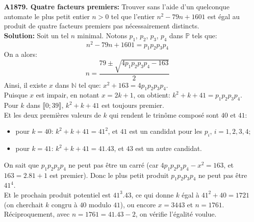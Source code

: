 \documentclass[11pt] {article}
\newcommand{\N} {\mathbb{N}}
\newcommand{\PS} {\mathbb{P}}
\begin{document}



\textbf{A1879. Quatre facteurs premiers:} Trouver sans l'aide d'un quelconque automate le plus petit entier $n > 0$ tel que l'entier $n^{2} - 79n + 1601$ est égal au produit de quatre facteurs premiers pas nécessairement distincts.\\

\textbf{Solution:} Soit un tel $n$ minimal. Notons $p_{1}$, $p_{2}$, $p_{3}$, $p_{4}$ dans $\PS$ tels que: \[n^{2} - 79n + 1601 = p_{1}p_{2}p_{3}p_{4}\]
On a alors: \[n = \frac{79 \pm \sqrt{4p_{1}p_{2}p_{3}p_{4} - 163}}{2}\]
Ainsi, il existe $x$ dans $\N$ tel que: $x^{2} + 163 = 4p_{1}p_{2}p_{3}p_{4}$.\\

Puisque $x$ est impair, en notant $x = 2k+1$, on obtient: $k^{2} + k + 41 = p_{1}p_{2}p_{3}p_{4}$.\\
Pour $k$ dans $\llbracket 0; 39\rrbracket$, $k^{2} + k + 41$ est toujours premier.\\
Et les deux premières valeurs de $k$ qui rendent le trinôme composé sont $40$ et $41$:
\begin{itemize}
\item pour $k = 40$: $k^{2} + k + 41 = 41^{2}$, et $41$ est un candidat pour les $p_{i}$, $i = 1, 2, 3, 4$;
\item pour $k = 41$: $k^{2} + k + 41 = 41.43$, et $43$ est un autre candidat.\\
\end{itemize}

On sait que $p_{1}p_{2}p_{3}p_{4}$ ne peut pas être un carré (car $4p_{1}p_{2}p_{3}p_{4} - x^{2} = 163$, et $163 = 2.81 + 1$ est premier).
Donc le plus petit produit $p_{1}p_{2}p_{3}p_{4}$ ne peut pas être $41^{4}$.\\

Et le prochain produit potentiel est $41^{3}.43$, ce qui donne $k$ égal à $41^{2} + 40 = 1721$ (on cherchait $k$ congru à $40$ modulo $41$), ou encore $x = 3443$ et $n = 1761$.\\

Réciproquement, avec $n = 1761 = 41.43 - 2$, on vérifie l'égalité voulue.
\end{document}
